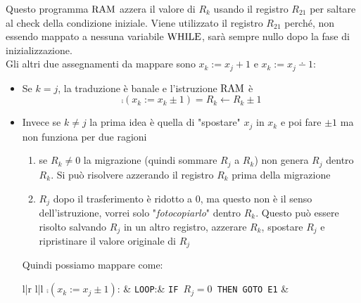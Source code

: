 Questo programma $\text{RAM}$ azzera il valore di $R_k$ usando il registro $R_{21}$ per saltare al check della condizione iniziale. Viene utilizzato il registro $R_{21}$ perché, non essendo mappato a nessuna variabile $\text{WHILE}$, sarà sempre nullo dopo la fase di inizializzazione.\\

Gli altri due assegnamenti da mappare sono $x_k:= x_j+1$ e $x_k := x_j \dotminus 1$:
\begin{itemize}
	\item Se $k=j$, la traduzione è banale e l'istruzione $\text{RAM}$ è
	$$ \comp(x_k := x_k \pm 1) = R_k \leftarrow R_k \pm 1 $$
	\item Invece se $k \neq j$ la prima idea è quella di "spostare" $x_j$ in $x_k$ e poi fare $\pm 1$ ma non funziona per due ragioni
	\begin{enumerate}
		\item se $R_k \neq 0$ la migrazione (quindi sommare $R_j$ a $R_k$) non genera $R_j$ dentro $R_k$. Si può risolvere azzerando il registro $R_k$ prima della migrazione
		\item $R_j$ dopo il trasferimento è ridotto a 0, ma questo non è il senso dell'istruzione, vorrei solo "\textit{fotocopiarlo}" dentro $R_k$. Questo può essere risolto salvando $R_j$ in un altro registro, azzerare $R_k$, spostare $R_j$ e ripristinare il valore originale di $R_j$
	\end{enumerate}
	Quindi possiamo mappare come:
	\begin{center}
		\renewcommand{\arraystretch}{1.25}
		\begin{tabular}{l|r l|l}
			$\comp (x_k := x_j \pm 1)$: & \texttt{LOOP}:& \texttt{IF $R_j = 0$ THEN GOTO E1}
			&
\end{tabular}
\end{center}
\end{itemize}
